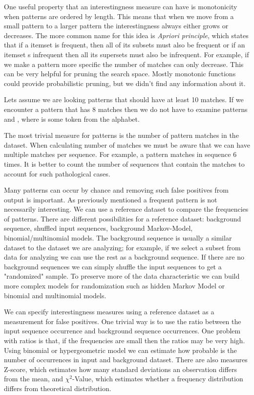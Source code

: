 One useful property that an interestingness measure can have is monotonicity when patterns are ordered by length. This means that when we move from a small pattern to a larger pattern the interestingness always either grows or decreases. The more common name for this idea is \emph{Apriori principle}, which states that if a itemset is frequent, then all of its subsets must also be frequent or if an itemset s infrequent then all its supersets must also be infrequent. For example, if we make a pattern more specific the number of matches can only decrease. This can be very helpful for pruning the search space. Mostly monotonic functions could provide probabilistic pruning, but we didn't find any information about it.

\begin{exmp}
Lets assume we are looking patterns that should have at least 10 matches. If we encounter a pattern  that has 8 matches then we do not have to examine patterns  and , where  is some token from the alphabet.
\end{exmp}

The most trivial measure for patterns is the number of pattern matches in the dataset. When calculating number of matches we must be aware that we can have multiple matches per sequence. For example, a pattern  matches in sequence  6 times. It is better to count the number of sequences that contain the matches to account for such pathological cases.

Many patterns can occur by chance and removing such false positives from output is important. As previously mentioned a frequent pattern is not necessarily interesting. We can use a reference dataset to compare the frequencies of patterns. There are different possibilities for a reference dataset: background sequence, shuffled input sequences, background Markov-Model, binomial/multinomial models. The background sequence is usually a similar dataset to the dataset we are analyzing; for example, if we select a subset from data for analyzing we can use the rest as a background sequence. If there are no background sequences we can simply shuffle the input sequences to get a "randomized" sample. To preserve more of the data characteristic we can build more complex models for randomization such as hidden Markov Model\cite{RatingMarkovModel} or binomial and multinomial models.

We can specify interestingness measures using a reference dataset as a measurement for false positives. One trivial way is to use the ratio between the input sequence occurrence and background sequence occurrences. One problem with ratios is that, if the frequencies are small then the ratios may be very high. Using binomial\cite{Binomial} or hypergeometric model we can estimate how probable is the number of occurrences in input and background dataset. There are also measures Z-score\cite{ZScores}, which estimates how many standard deviations an observation differs from the mean, and $\chi^2$-Value\cite{ChiValue}, which estimates whether a frequency distribution differs from theoretical distribution.

